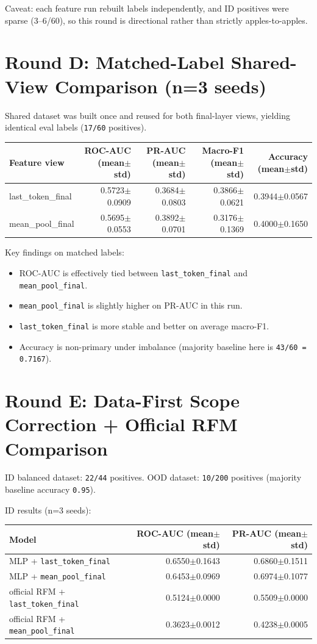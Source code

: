 \documentclass[11pt]{article}
\begin{document}
\noindent
Caveat: each feature run rebuilt labels independently, and ID positives were sparse (3--6/60), so this round is directional rather than strictly apples-to-apples.

\section*{Round D: Matched-Label Shared-View Comparison (n=3 seeds)}
Shared dataset was built once and reused for both final-layer views, yielding identical eval labels (\texttt{17/60} positives).

\begin{center}
\begin{tabular}{@{}lrrrr@{}}
\toprule
Feature view & ROC-AUC (mean$\pm$std) & PR-AUC (mean$\pm$std) & Macro-F1 (mean$\pm$std) & Accuracy (mean$\pm$std) \\
\midrule
last\_token\_final & 0.5723$\pm$0.0909 & 0.3684$\pm$0.0803 & 0.3866$\pm$0.0621 & 0.3944$\pm$0.0567 \\
mean\_pool\_final & 0.5695$\pm$0.0553 & 0.3892$\pm$0.0701 & 0.3176$\pm$0.1369 & 0.4000$\pm$0.1650 \\
\bottomrule
\end{tabular}
\end{center}

\noindent
Key findings on matched labels:
\begin{itemize}
  \item ROC-AUC is effectively tied between \texttt{last\_token\_final} and \texttt{mean\_pool\_final}.
  \item \texttt{mean\_pool\_final} is slightly higher on PR-AUC in this run.
  \item \texttt{last\_token\_final} is more stable and better on average macro-F1.
  \item Accuracy is non-primary under imbalance (majority baseline here is \texttt{43/60 = 0.7167}).
\end{itemize}

\section*{Round E: Data-First Scope Correction + Official RFM Comparison}
ID balanced dataset: \texttt{22/44} positives. OOD dataset: \texttt{10/200} positives (majority baseline accuracy \texttt{0.95}).

\noindent
ID results (n=3 seeds):
\begin{center}
\begin{tabular}{@{}lrr@{}}
\toprule
Model & ROC-AUC (mean$\pm$std) & PR-AUC (mean$\pm$std) \\
\midrule
MLP + \texttt{last\_token\_final} & 0.6550$\pm$0.1643 & 0.6860$\pm$0.1511 \\
MLP + \texttt{mean\_pool\_final} & 0.6453$\pm$0.0969 & 0.6974$\pm$0.1077 \\
official RFM + \texttt{last\_token\_final} & 0.5124$\pm$0.0000 & 0.5509$\pm$0.0000 \\
official RFM + \texttt{mean\_pool\_final} & 0.3623$\pm$0.0012 & 0.4238$\pm$0.0005 \\
\bottomrule
\end{tabular}
\end{center}
\end{document}
